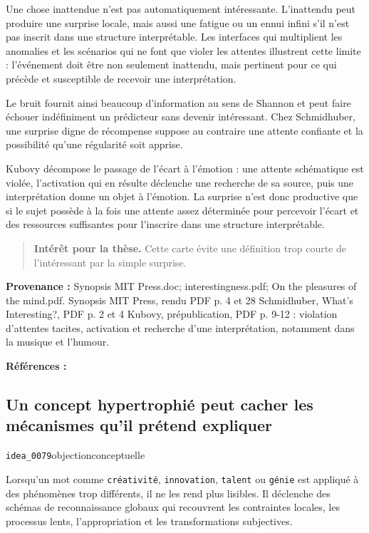 \documentclass[10pt,a4paper]{article}
\begin{document}
Une chose inattendue n'est pas automatiquement intéressante. L'inattendu peut produire une surprise locale, mais aussi une fatigue ou un ennui infini s'il n'est pas inscrit dans une structure interprétable. Les interfaces qui multiplient les anomalies et les scénarios qui ne font que violer les attentes illustrent cette limite : l'événement doit être non seulement inattendu, mais pertinent pour ce qui précède et susceptible de recevoir une interprétation.

Le bruit fournit ainsi beaucoup d'information au sens de Shannon et peut faire échouer indéfiniment un prédicteur sans devenir intéressant. Chez Schmidhuber, une surprise digne de récompense suppose au contraire une attente confiante et la possibilité qu'une régularité soit apprise.

Kubovy décompose le passage de l'écart à l'émotion : une attente schématique est violée, l'activation qui en résulte déclenche une recherche de sa source, puis une interprétation donne un objet à l'émotion. La surprise n'est donc productive que si le sujet possède à la fois une attente assez déterminée pour percevoir l'écart et des ressources suffisantes pour l'inscrire dans une structure interprétable.

\begin{quote}
\textbf{Intérêt pour la thèse.} Cette carte évite une définition trop courte de l'intéressant par la simple surprise.
\end{quote}
{\footnotesize\color{metadata}\textbf{Provenance :} Synopsis MIT Press.doc; interestingness.pdf; On the pleasures of the mind.pdf. Synopsis MIT Press, rendu PDF p. 4 et 28 Schmidhuber, What's Interesting?, PDF p. 2 et 4 Kubovy, prépublication, PDF p. 9-12 : violation d'attentes tacites, activation et recherche d'une interprétation, notamment dans la musique et l'humour.\par}
{\footnotesize\color{metadata}\textbf{Références :} \parencite{schmidhuber1997interesting,kubovy1999pleasures}\par}

\subsection{Un concept hypertrophié peut cacher les mécanismes qu'il prétend expliquer}
{\small\color{metadata} \texttt{idea\_0079}\quad\textbullet\quad objection\quad\textbullet\quad conceptuelle\par}

Lorsqu'un mot comme \texttt{créativité}, \texttt{innovation}, \texttt{talent} ou \texttt{génie} est appliqué à des phénomènes trop différents, il ne les rend plus lisibles. Il déclenche des schémas de reconnaissance globaux qui recouvrent les contraintes locales, les processus lents, l'appropriation et les transformations subjectives.
\end{document}
